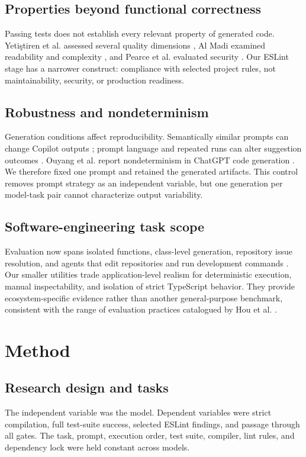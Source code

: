 \documentclass[conference]{IEEEtran}
\begin{document}
\subsection{Properties beyond functional correctness}
Passing tests does not establish every relevant property of generated code. Yeti\c{s}tiren et al. assessed several quality dimensions \cite{yetistiren2022quality}, Al Madi examined readability and complexity \cite{almadi2022readable}, and Pearce et al. evaluated security \cite{pearce2022security}. Our ESLint stage has a narrower construct: compliance with selected project rules, not maintainability, security, or production readiness.

\subsection{Robustness and nondeterminism}
Generation conditions affect reproducibility. Semantically similar prompts can change Copilot outputs \cite{mastropaolo2023robustness}; prompt language and repeated runs can alter suggestion outcomes \cite{koyanagi2024languages}. Ouyang et al. report nondeterminism in ChatGPT code generation \cite{ouyang2025nondeterminism}. We therefore fixed one prompt and retained the generated artifacts. This control removes prompt strategy as an independent variable, but one generation per model-task pair cannot characterize output variability.

\subsection{Software-engineering task scope}
Evaluation now spans isolated functions, class-level generation, repository issue resolution, and agents that edit repositories and run development commands \cite{chen2021humaneval,du2024classeval,jimenez2024swebench,yang2024sweagent}. Our smaller utilities trade application-level realism for deterministic execution, manual inspectability, and isolation of strict TypeScript behavior. They provide ecosystem-specific evidence rather than another general-purpose benchmark, consistent with the range of evaluation practices catalogued by Hou et al. \cite{hou2024slr}.

\section{Method}
\subsection{Research design and tasks}
The independent variable was the model. Dependent variables were strict compilation, full test-suite success, selected ESLint findings, and passage through all gates. The task, prompt, execution order, test suite, compiler, lint rules, and dependency lock were held constant across models.
\end{document}
